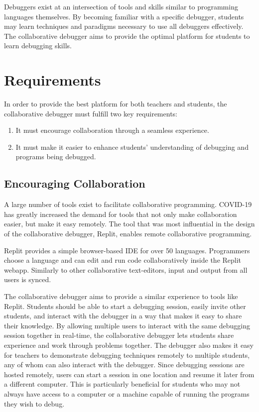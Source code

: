 \documentclass[12pt]{article}
\begin{document}
Debuggers exist at an intersection of tools and skills similar to
programming languages themselves. By becoming familiar with a specific
debugger, students may learn techniques and paradigms necessary to use
all debuggers effectively.  The collaborative debugger aims to provide
the optimal platform for students to learn debugging skills.

\section{Requirements}

In order to provide the best platform for both teachers and students,
the collaborative debugger must fulfill two key requirements:

\begin{enumerate}
\item It must encourage collaboration through a seamless experience.
\item It must make it easier to enhance students' understanding of
  debugging and programs being debugged.
\end{enumerate}

\subsection{Encouraging Collaboration} \label{exisitingcollab}

A large number of tools exist to facilitate collaborative programming.
COVID-19 has greatly increased the demand for tools that not only make
collaboration easier, but make it easy remotely.  The tool that was
most influential in the design of the collaborative debugger,
Replit\cite{replit}, enables remote collaborative programming.

Replit provides a simple browser-based IDE for over 50 languages.
Programmers choose a language and can edit and run code
collaboratively inside the Replit webapp.  Similarly to other
collaborative text-editors, input and output from all users is synced.
\par

The collaborative debugger aims to provide a similar experience to
tools like Replit.  Students should be able to start a debugging
session, easily invite other students, and interact with the debugger
in a way that makes it easy to share their knowledge.  By allowing
multiple users to interact with the same debugging session together in
real-time, the collaborative debugger lets students share experience
and work through problems together.  The debugger also makes it easy
for teachers to demonstrate debugging techniques remotely to multiple
students, any of whom can also interact with the debugger.  Since
debugging sessions are hosted remotely, users can start a session in
one location and resume it later from a different computer.  This is
particularly beneficial for students who may not always have access to
a computer or a machine capable of running the programs they wish to
debug.
\par
\end{document}
